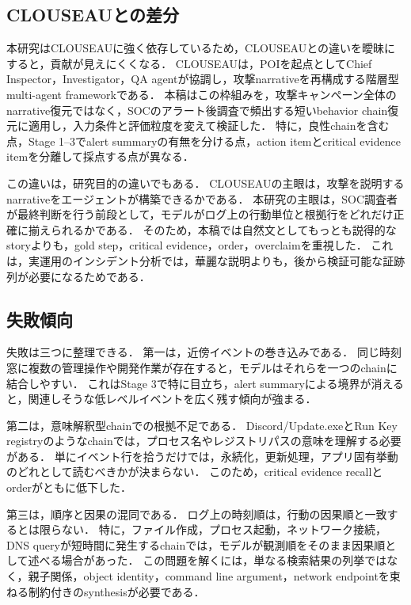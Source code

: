 \documentclass[dvipdfmx]{FITpaper}
\begin{document}
\subsection{CLOUSEAUとの差分}

本研究はCLOUSEAUに強く依存しているため，CLOUSEAUとの違いを曖昧にすると，貢献が見えにくくなる．
CLOUSEAUは，POIを起点としてChief Inspector，Investigator，QA agentが協調し，攻撃narrativeを再構成する階層型multi-agent frameworkである．
本稿はこの枠組みを，攻撃キャンペーン全体のnarrative復元ではなく，SOCのアラート後調査で頻出する短いbehavior chain復元に適用し，入力条件と評価粒度を変えて検証した．
特に，良性chainを含む点，Stage 1--3でalert summaryの有無を分ける点，action itemとcritical evidence itemを分離して採点する点が異なる．

この違いは，研究目的の違いでもある．
CLOUSEAUの主眼は，攻撃を説明するnarrativeをエージェントが構築できるかである．
本研究の主眼は，SOC調査者が最終判断を行う前段として，モデルがログ上の行動単位と根拠行をどれだけ正確に揃えられるかである．
そのため，本稿では自然文としてもっとも説得的なstoryよりも，gold step，critical evidence，order，overclaimを重視した．
これは，実運用のインシデント分析では，華麗な説明よりも，後から検証可能な証跡列が必要になるためである．

\subsection{失敗傾向}

失敗は三つに整理できる．
第一は，近傍イベントの巻き込みである．
同じ時刻窓に複数の管理操作や開発作業が存在すると，モデルはそれらを一つのchainに結合しやすい．
これはStage 3で特に目立ち，alert summaryによる境界が消えると，関連しそうな低レベルイベントを広く残す傾向が強まる．

第二は，意味解釈型chainでの根拠不足である．
Discord/Update.exeとRun Key registryのようなchainでは，プロセス名やレジストリパスの意味を理解する必要がある．
単にイベント行を拾うだけでは，永続化，更新処理，アプリ固有挙動のどれとして読むべきかが決まらない．
このため，critical evidence recallとorderがともに低下した．

第三は，順序と因果の混同である．
ログ上の時刻順は，行動の因果順と一致するとは限らない．
特に，ファイル作成，プロセス起動，ネットワーク接続，DNS queryが短時間に発生するchainでは，モデルが観測順をそのまま因果順として述べる場合があった．
この問題を解くには，単なる検索結果の列挙ではなく，親子関係，object identity，command line argument，network endpointを束ねる制約付きのsynthesisが必要である．
\end{document}
